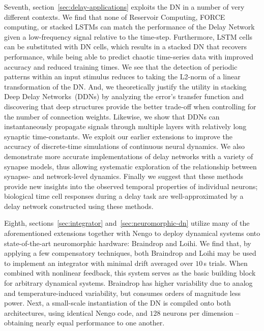 Seventh, section~\ref{sec:delay-applications} exploits the DN in a number of very different contexts.
We find that none of Reservoir Computing, FORCE computing, or stacked LSTMs can match the performance of the Delay Network given a low-frequency signal relative to the time-step.
Furthermore, LSTM cells can be substituted with DN cells, which results in a stacked DN that recovers performance, while being able to predict chaotic time-series data with improved accuracy and reduced training times.
We see that the detection of periodic patterns within an input stimulus reduces to taking the L2-norm of a linear transformation of the DN.
And, we theoretically justify the utility in stacking Deep Delay Networks~(DDNs) by analyzing the error's transfer function and discovering that deep structures provide the better trade-off when controlling for the number of connection weights.
Likewise, we show that DDNs can instantaneously propagate signals through multiple layers with relatively long synaptic time-constants.
We exploit our earlier extensions to improve the accuracy of discrete-time simulations of continuous neural dynamics.
We also demonstrate more accurate implementations of delay networks with a variety of synapse models, thus allowing systematic exploration of the relationship between synapse- and network-level dynamics.
Finally we suggest that these methods provide new insights into the observed temporal properties of individual neurons; biological time cell responses during a delay task are well-approximated by a delay network constructed using these methods.

Eighth, sections~\ref{sec:integrator} and~\ref{sec:neuromorphic-dn} utilize many of the aforementioned extensions together with Nengo to deploy dynamical systems onto state-of-the-art neuromorphic hardware: Braindrop and Loihi.
We find that, by applying a few compensatory techniques, both Braindrop and Loihi may be used to implement an integrator with minimal drift averaged over $10$\,s trials.
When combined with nonlinear feedback, this system serves as the basic building block for arbitrary dynamical systems.
Braindrop has higher variability due to analog and temperature-induced variability, but consumes orders of magnitude less power.
Next, a small-scale instantiation of the DN is compiled onto both architectures, using identical Nengo code, and $128$ neurons per dimension -- obtaining nearly equal performance to one another.

